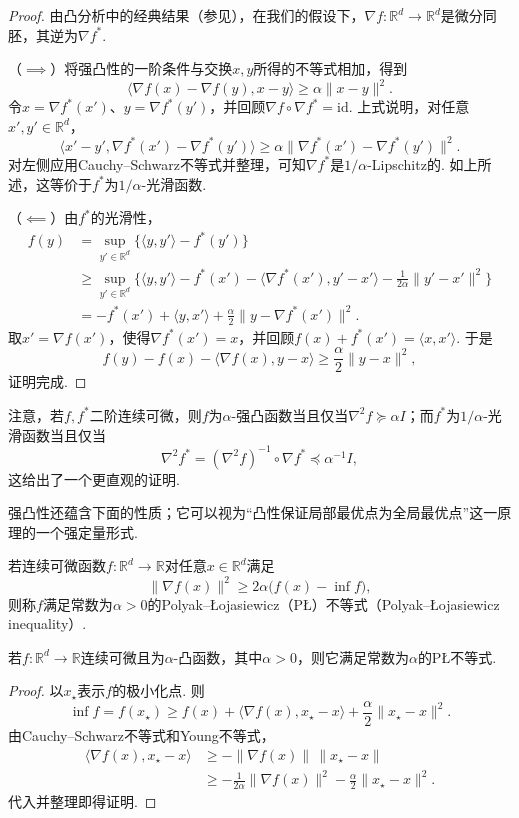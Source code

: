 \begin{proof}
由凸分析中的经典结果（参见\cite[定理25.5、定理26.6和引理26.7]{ref274}），在我们的假设下，$\nabla f:\mathbb R^d\to\mathbb R^d$是微分同胚，其逆为$\nabla f^*$.

（$\implies$）将强凸性的一阶条件与交换$x,y$所得的不等式相加，得到
$$
\langle\nabla f(x)-\nabla f(y),x-y\rangle\geq\alpha\|x-y\|^2.
$$
令$x=\nabla f^*(x')$、$y=\nabla f^*(y')$，并回顾$\nabla f\circ\nabla f^*=\mathrm{id}$. 上式说明，对任意$x',y'\in\mathbb R^d$，
$$
\langle x'-y',\nabla f^*(x')-\nabla f^*(y')\rangle
\geq\alpha\|\nabla f^*(x')-\nabla f^*(y')\|^2.
$$
对左侧应用Cauchy--Schwarz不等式并整理，可知$\nabla f^*$是$1/\alpha$-Lipschitz的. 如上所述，这等价于$f^*$为$1/\alpha$-光滑函数.

（$\impliedby$）由$f^*$的光滑性，
$$
\begin{aligned}
f(y)&=\sup_{y'\in\mathbb R^d}\{\langle y,y'\rangle-f^*(y')\}\\
&\geq\sup_{y'\in\mathbb R^d}\bigl\{\langle y,y'\rangle-f^*(x')
-\langle\nabla f^*(x'),y'-x'\rangle-\tfrac1{2\alpha}\|y'-x'\|^2\bigr\}\\
&=-f^*(x')+\langle y,x'\rangle+\frac\alpha2\|y-\nabla f^*(x')\|^2.
\end{aligned}
$$
取$x'=\nabla f(x')$，使得$\nabla f^*(x')=x$，并回顾$f(x)+f^*(x')=\langle x,x'\rangle$. 于是
$$
f(y)-f(x)-\langle\nabla f(x),y-x\rangle\geq\frac\alpha2\|y-x\|^2,
$$
证明完成.
\end{proof}

注意，若$f,f^*$二阶连续可微，则$f$为$\alpha$-强凸函数当且仅当$\nabla^2 f\succeq\alpha I$；而$f^*$为$1/\alpha$-光滑函数当且仅当
$$
\nabla^2f^*=(\nabla^2f)^{-1}\circ\nabla f^*\preceq\alpha^{-1}I,
$$
这给出了一个更直观的证明.

强凸性还蕴含下面的性质；它可以视为“凸性保证局部最优点为全局最优点”这一原理的一个强定量形式.

\begin{definition}\label{def:A.10}
若连续可微函数$f:\mathbb R^d\to\mathbb R$对任意$x\in\mathbb R^d$满足
$$
\|\nabla f(x)\|^2\geq2\alpha\bigl(f(x)-\inf f\bigr),
$$
则称$f$满足常数为$\alpha>0$的Polyak--Łojasiewicz（PŁ）不等式（Polyak--Łojasiewicz inequality）.
\end{definition}

\begin{lemma}\label{lem:A.11}
若$f:\mathbb R^d\to\mathbb R$连续可微且为$\alpha$-凸函数，其中$\alpha>0$，则它满足常数为$\alpha$的PŁ不等式.
\end{lemma}
\begin{proof}
以$x_\star$表示$f$的极小化点. 则
$$
\inf f=f(x_\star)\geq f(x)+\langle\nabla f(x),x_\star-x\rangle
+\frac\alpha2\|x_\star-x\|^2.
$$
由Cauchy--Schwarz不等式和Young不等式，
$$
\begin{aligned}
\langle\nabla f(x),x_\star-x\rangle
&\geq-\|\nabla f(x)\|\,\|x_\star-x\|\\
&\geq-\frac1{2\alpha}\|\nabla f(x)\|^2-\frac\alpha2\|x_\star-x\|^2.
\end{aligned}
$$
代入并整理即得证明.
\end{proof}

